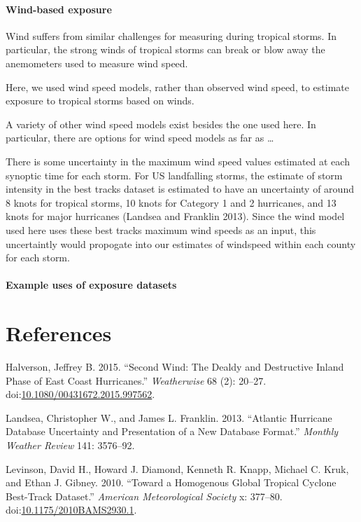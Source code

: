 \documentclass[]{elsarticle} %
\begin{document}
\paragraph{Wind-based exposure}\label{wind-based-exposure-1}

Wind suffers from similar challenges for measuring during tropical
storms. In particular, the strong winds of tropical storms can break or
blow away the anemometers used to measure wind speed.

Here, we used wind speed models, rather than observed wind speed, to
estimate exposure to tropical storms based on winds.

A variety of other wind speed models exist besides the one used here. In
particular, there are options for wind speed models as far as \ldots{}

There is some uncertainty in the maximum wind speed values estimated at
each synoptic time for each storm. For US landfalling storms, the
estimate of storm intensity in the best tracks dataset is estimated to
have an uncertainty of around 8 knots for tropical storms, 10 knots for
Category 1 and 2 hurricanes, and 13 knots for major hurricanes (Landsea
and Franklin 2013). Since the wind model used here uses these best
tracks maximum wind speeds as an input, this uncertaintly would
propogate into our estimates of windspeed within each county for each
storm.

\paragraph{Example uses of exposure
datasets}\label{example-uses-of-exposure-datasets}

\section*{References}\label{references}

\hypertarget{refs}{}
\hypertarget{ref-Halverson2015}{}
Halverson, Jeffrey B. 2015. ``Second Wind: The Dealdy and Destructive
Inland Phase of East Coast Hurricanes.'' \emph{Weatherwise} 68 (2):
20--27.
doi:\href{https://doi.org/10.1080/00431672.2015.997562}{10.1080/00431672.2015.997562}.

\hypertarget{ref-Landsea2013}{}
Landsea, Christopher W., and James L. Franklin. 2013. ``Atlantic
Hurricane Database Uncertainty and Presentation of a New Database
Format.'' \emph{Monthly Weather Review} 141: 3576--92.

\hypertarget{ref-Levinson2010}{}
Levinson, David H., Howard J. Diamond, Kenneth R. Knapp, Michael C.
Kruk, and Ethan J. Gibney. 2010. ``Toward a Homogenous Global Tropical
Cyclone Best-Track Dataset.'' \emph{American Meteorological Society} x:
377--80.
doi:\href{https://doi.org/10.1175/2010BAMS2930.1}{10.1175/2010BAMS2930.1}.
\end{document}
